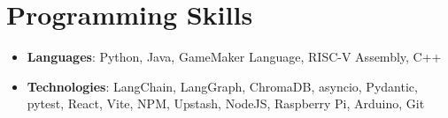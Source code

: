 \documentclass[letterpaper,11pt]{article}
\newcommand{\resumeSubHeadingListStart}{\begin{itemize}[leftmargin=*]}
\newcommand{\resumeSubHeadingListEnd}{\end{itemize}}
\begin{document}
%
\section{Programming Skills}
 \resumeSubHeadingListStart
   \item{
     \textbf{Languages}{: Python, Java, GameMaker Language, RISC-V Assembly, C++}
   }
   \item{
     \textbf{Technologies}{: LangChain, LangGraph, ChromaDB, asyncio, Pydantic, pytest, React, Vite, NPM, Upstash, NodeJS, Raspberry Pi, Arduino, Git}
   }
 \resumeSubHeadingListEnd


\end{document}
